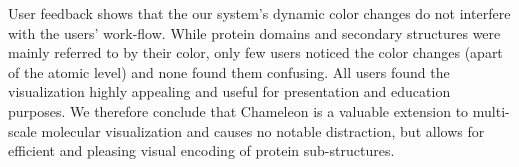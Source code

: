 \documentclass{egpubl}
\begin{document}
User feedback shows that the our system's dynamic color changes do not interfere with the users' work-flow. 
While protein domains and secondary structures were mainly referred to by their color, only few users noticed the color changes (apart of the atomic level) and none found them confusing. 
All users found the visualization highly appealing and useful for presentation and education purposes. 
We therefore conclude that Chameleon is a valuable extension to multi-scale molecular visualization and causes no notable distraction, but allows for efficient and pleasing visual encoding of protein sub-structures. 

	
%	
%	
%	
%	
\end{document}
